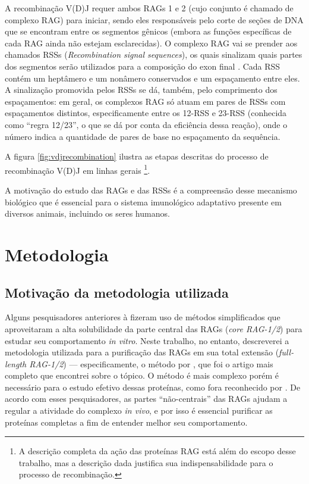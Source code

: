 \documentclass[
	12pt,				%
	openright,			%
	twoside,			%
	a4paper,			%
	]{abntex2}
\begin{document}
A recombinação V(D)J requer ambos RAGs 1 e 2 (cujo conjunto é chamado de complexo RAG) para iniciar, sendo eles responsáveis pelo corte de seções de DNA que se encontram entre os segmentos gênicos (embora as funções específicas de cada RAG ainda não estejam esclarecidas). O complexo RAG vai se prender aos chamados RSSs (\textit{Recombination signal sequences}), os quais sinalizam quais partes dos segmentos serão utilizados para a composição do exon final \cite{main}. Cada RSS contém um heptâmero e um nonâmero conservados e um espaçamento entre eles. A sinalização promovida pelos RSSs se dá, também, pelo comprimento dos espaçamentos: em geral, os complexos RAG só atuam em pares de RSSs com espaçamentos distintos, especificamente entre os 12-RSS e 23-RSS (conhecida como ``regra 12/23'', o que se dá por conta da eficiência dessa reação), onde o número indica a quantidade de pares de base no espaçamento da sequência.

A figura \ref{fig:vdjrecombination} ilustra as etapas descritas do processo de recombinação V(D)J em linhas gerais%
\footnote{A descrição completa da ação das proteínas RAG está além do escopo desse trabalho, mas a descrição dada justifica sua indispensabilidade para o processo de recombinação.}.

A motivação do estudo das RAGs e das RSSs é a compreensão desse mecanismo biológico que é essencial para o sistema imunológico adaptativo presente em diversos animais, incluindo os seres humanos.

\chapter{Metodologia}

\section{Motivação da metodologia utilizada}

Alguns pesquisadores anteriores à  fizeram uso de métodos simplificados que aproveitaram a alta solubilidade da parte central das RAGs (\textit{core RAG-1/2}) para estudar seu comportamento \textit{in vitro}. Neste trabalho, no entanto, descreverei a metodologia utilizada para a purificação das RAGs em sua total extensão (\textit{full-length RAG-1/2}) --- especificamente, o método por , que foi o artigo mais completo que encontrei sobre o tópico. O método é mais complexo porém é necessário para o estudo efetivo dessas proteínas, como fora reconhecido por . De acordo com esses pesquisadores, as partes ``não-centrais'' das RAGs ajudam a regular a atividade do complexo \textit{in vivo}, e por isso é essencial purificar as proteínas completas a fim de entender melhor seu comportamento.
\end{document}
